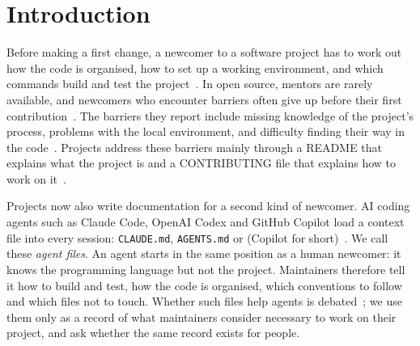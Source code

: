 \documentclass[sigconf,nonacm]{acmart}
\begin{document}
\section{Introduction}

Before making a first change, a newcomer to a software project has to work out how the code is
organised, how to set up a working environment, and which commands build and test the
project~\cite{sim1998rampup,begel2008novice,dagenais2010landscape}. In open source, mentors are
rarely available, and newcomers who encounter barriers often give up before their first
contribution~\cite{steinmacher2015social,steinmacher2015barriers}. The barriers they report include
missing knowledge of the project's process, problems with the local environment, and difficulty
finding their way in the code~\cite{steinmacher2015barriers,steinmacher2015social}. Projects address
these barriers mainly through a README that explains what the project is and a CONTRIBUTING file
that explains how to work on it~\cite{prana2019readme,steinmacher2019letmein}.

Projects now also write documentation for a second kind of newcomer. AI coding agents such as
Claude Code, OpenAI Codex and GitHub Copilot load a context file into every session:
\texttt{CLAUDE.md}, \texttt{AGENTS.md} or  (Copilot for
short)~\cite{chatlatanagulchai2026agentreadmes,mohsenimofidi2026context}. We call these
\emph{agent files}. An agent starts in the same position as a human newcomer: it knows the
programming language but not the project. Maintainers therefore tell it how to build and test, how
the code is organised, which conventions to follow and which files not to touch. Whether such files
help agents is debated~\cite{gloaguen2026agentsmd}; we use them only as a record of what maintainers
consider necessary to work on their project, and ask whether the same record exists for people.
\end{document}
